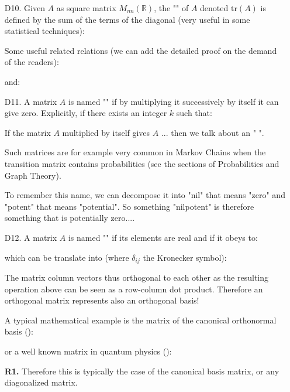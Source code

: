 \begin{enumerate}
		
		\item[D10.] Given $A$ as square matrix $M_{nn}(\mathbb{R})$, the "" of $A$ denoted $\text{tr}(A)$ is defined by the sum of the terms of the diagonal (very useful in some statistical techniques):
		
		Some useful related relations (we can add the detailed proof on the demand of the readers):
		
		and:
		

		\item[D11.] A matrix $A$ is named "" if by multiplying it successively by itself it can give zero. Explicitly, if there exists an integer $k$ such that:
		
		If the matrix $A$ multiplied by itself gives $A$ ... then we talk about an " ".
		
		Such matrices are for example very common in Markov Chains when the transition matrix contains probabilities (see the sections of Probabilities and Graph Theory).
		\begin{tcolorbox}[title=Remark,colframe=black,arc=10pt]
		To remember this name, we can decompose it into "nil" that means "zero" and "potent" that means "potential". So something "nilpotent" is therefore something that is potentially zero....
		\end{tcolorbox}
		
		\item[D12.] A matrix $A$ is named "" if its elements are real and if it obeys to:
		
		which can be translate into (where $\delta_{ij}$ the Kronecker symbol):
		
		The matrix column vectors thus orthogonal to each other as the resulting operation above can be seen as a row-column dot product. Therefore an orthogonal matrix represents also an orthogonal basis!
		
		A typical mathematical example is the matrix of the canonical orthonormal basis ():
		
		or a well known matrix in quantum physics ():
		
		\begin{tcolorbox}[title=Remarks,colframe=black,arc=10pt]
		\textbf{R1.} Therefore this is typically the case of the canonical basis matrix, or any diagonalized matrix.\\
		

\end{tcolorbox}
\end{enumerate}
